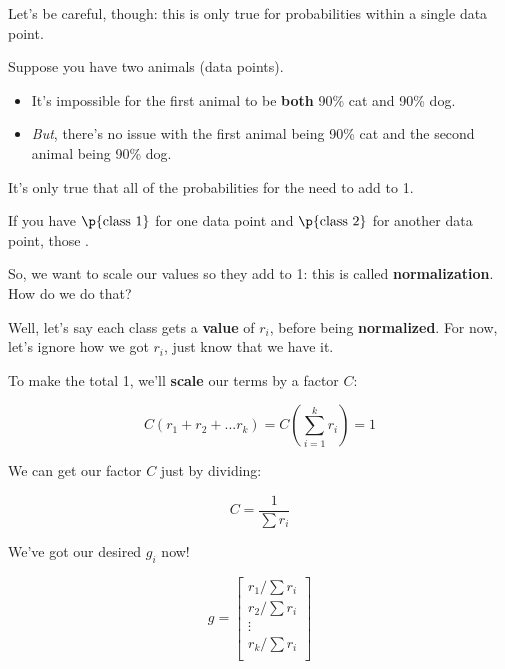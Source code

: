         Let's be careful, though: this is only true for probabilities within a single data point.
        
        \miniex Suppose you have two animals (data points).
        
            \begin{itemize}
                \item It's impossible for the first animal to be \textbf{both} 90\% cat and 90\% dog.
                \item \textit{But}, there's no issue with the first animal being 90\% cat and the second animal being 90\% dog.\\
            \end{itemize}

        \begin{clarification}
            It's only true that all of the probabilities for the  need to add to 1.

            If you have $\p{\text{class 1}}$ for one data point and $\p{\text{class 2}}$ for another data point, those .
        \end{clarification}
        
        So, we want to scale our values so they add to 1: this is called \textbf{normalization}. How do we do that?
        
        Well, let's say each class gets a \textbf{value} of $r_i$, before being \textbf{normalized}. For now, let's ignore how we got $r_i$, just know that we have it.
        
        To make the total 1, we'll \textbf{scale} our terms by a factor $C$:
        
        \begin{equation}
            C(r_1+r_2+...r_k) 
            = 
            C \left(\sum_{i=1}^k r_i \right)
            =
            1  
        \end{equation}
        
        We can get our factor $C$ just by dividing:
        
        \begin{equation}
            C 
            =
            \frac{1}{\sum r_i}
        \end{equation}
        
        We've got our desired $g_i$ now!
        
        \begin{equation}
            g = 
            \begin{bmatrix}
                r_1/\sum r_i  \\
                r_2/\sum r_i  \\
                \vdots  \\
                r_k/\sum r_i  \\
            \end{bmatrix}
        \end{equation}
        
